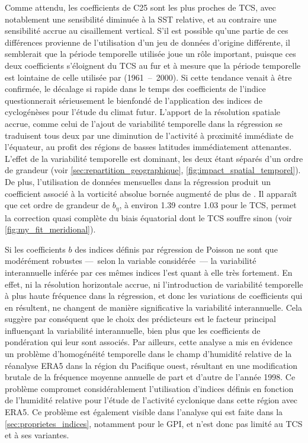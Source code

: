 \documentclass[../main.tex]{subfiles}
\begin{document}
Comme attendu, les coefficients de C25 sont les plus proches de TCS, avec notablement une sensibilité diminuée à la SST relative, et au contraire une
sensibilité accrue au cisaillement vertical. S'il est possible qu'une partie de ces différences provienne de l'utilisation d'un jeu de données d'origine
différente, il semblerait que la période temporelle utilisée joue un rôle important, puisque ces deux coefficients s'éloignent du TCS au fur et à mesure que la
période temporelle est lointaine de celle utilisée par \textcite{tippett_poisson_2011} (\num{1961}~--~\num{2000}). Si cette tendance venait à être confirmée, le
décalage si rapide dans le temps des coefficients de l'indice questionnerait sérieusement le bienfondé de l'application des indices de cyclogénèses pour l'étude
du climat futur. L'apport de la résolution spatiale accrue, comme celui de l'ajout de variabilité temporelle dans la régression se traduisent tous deux par une
diminution de l'activité à proximité immédiate de l'équateur, au profit des régions de basses latitudes immédiatement attenantes. L'effet de la variabilité
temporelle est dominant, les deux étant séparés d'un ordre de grandeur (voir \cref{sec:repartition_geographique}, \cref{fig:impact_spatial_temporel}). De plus,
l'utilisation de données mensuelles dans la régression produit un coefficient associé à la vorticité absolue bornée augmenté de plus de . Il apparaît
que cet ordre de grandeur de $b_\eta$, à environ \num{1.39} contre \num{1.03} pour le TCS, permet la correction quasi complète du biais équatorial dont le TCS
souffre sinon (voir \cref{fig:my_fit_meridional}).

Si les coefficients $b$ des indices définis par régression de Poisson ne sont que modérément robustes ---~selon la variable considérée~--- la variabilité
interannuelle inférée par ces mêmes indices l'est quant à elle très fortement. En effet, ni la résolution horizontale accrue, ni l'introduction de variabilité
temporelle à plus haute fréquence dans la régression, et donc les variations de coefficients qui en résultent, ne changent de manière significative la
variabilité interannuelle. Cela suggère par conséquent que le choix des prédicteurs est le facteur principal influençant la variabilité interannuelle, bien plus
que les coefficients de pondération qui leur sont associés. Par ailleurs, cette analyse a mis en évidence un problème d'homogénéité temporelle dans le champ
d'humidité relative de la réanalyse ERA5 dans la région du Pacifique ouest, résultant en une modification brutale de la fréquence moyenne annuelle de part et
d'autre de l'année \num{1998}. Ce problème compromet considérablement l'utilisation d'indices définis en fonction de l'humidité relative pour l'étude de
l'activité cyclonique dans cette région avec ERA5. Ce problème est également visible dans l'analyse qui est faite dans la \cref{sec:proprietes_indices},
notamment pour le GPI, et n'est donc pas limité au TCS et à ses variantes.
\end{document}

